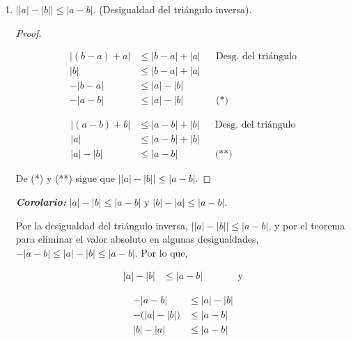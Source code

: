 \documentclass[11pt]{article}
\begin{document}
\begin{enumerate}[label=\alph*)]
    \item $\big| |a|-|b| \big| \leq |a-b|$. (Desigualdad del triángulo inversa).

    \begin{proof} \leavevmode
    \begin{center}\vspace{-2.5em}
    \begin{minipage}[t]{.5\linewidth}
    \begin{align*}
        |(b-a)+a| &\leq |b-a|+|a| && \text{Desg. del triángulo} \\
        |b| &\leq |b-a|+|a| \\
        -|b-a| &\leq |a|-|b| \\
        -|a-b| &\leq |a|-|b| && \text{(*)}
    \end{align*}
    \end{minipage}%
    \begin{minipage}[t]{.5\linewidth}
    \begin{align*}
        |(a-b)+b| &\leq |a-b|+|b| && \text{Desg. del triángulo} \\
        |a| &\leq |a-b|+|b| \\
        |a|-|b| &\leq |a-b| && \text{(**)}
    \end{align*}
    \end{minipage}
    \end{center}
    De (*) y (**) sigue que $\big| |a| - |b| \big| \leq |a-b|$.
    \end{proof} \vspace{-1em}

    \textbf{\textit{Corolario:}} $|a|-|b|\leq |a-b|$ y $|b|-|a|\leq |a-b|$.

    Por la desigualdad del triángulo inversa, $\big| |a|-|b| \big| \leq |a-b|$, y por el teorema para eliminar el valor absoluto en algunas desigualdades, $-|a-b|\leq |a|-|b|\leq |a-b|$. Por lo que,
    \begin{center}\vspace{-2.5em}
        \begin{minipage}[t]{.3\linewidth}
        \begin{align*}
            |a|-|b| &\leq |a-b| && \qquad \text{y}
        \end{align*}
        \end{minipage}%
        \begin{minipage}[t]{.3\linewidth}
        \begin{align*}
            -|a-b| &\leq |a|-|b|\\
            -\bigl(|a|-|b|\bigr) &\leq |a-b| \\
            |b|-|a| &\leq |a-b|
        \end{align*}
        \end{minipage}
        \end{center}


\end{enumerate}
\end{document}
